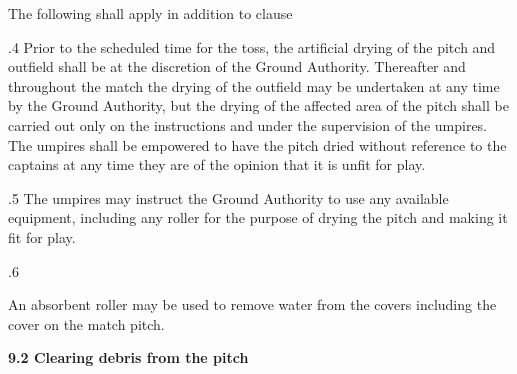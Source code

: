 \documentclass[12pt]{article}
\begin{document}
\vspace{\baselineskip}
{\fontsize{9pt}{10.8pt}\selectfont The following shall apply in addition to clause \par}\par


\vspace{\baselineskip}
\begin{adjustwidth}{0.5in}{0.07in}
\begin{justify}
{\fontsize{9pt}{10.8pt}.4 \tabto{0.49in} Prior to the scheduled time for the toss, the artificial drying of the pitch and outfield shall be at the discretion of the Ground Authority. Thereafter and throughout the match the drying of the outfield may be undertaken at any time by the Ground Authority, but the drying of the affected area of the pitch shall be carried out only on the instructions and under the supervision of the umpires. The umpires shall be empowered to have the pitch dried without reference to the captains at any time they are of the opinion that it is unfit for play.\par}
\end{justify}\par

\end{adjustwidth}


\vspace{\baselineskip}
\begin{adjustwidth}{0.5in}{0.15in}
{\fontsize{9pt}{10.8pt}.5 \tabto{0.49in} The umpires may instruct the Ground Authority to use any available equipment, including any roller for the purpose of drying the pitch and making it fit for play.\par}\par

\end{adjustwidth}


\vspace{\baselineskip}
{\fontsize{9pt}{10.8pt}.6 \tabto{0.49in} {\fontsize{8pt}{9.6pt}\selectfont An absorbent roller may be used to remove water from the covers including the cover on the match pitch.\par}\par}\par


\vspace{\baselineskip}
{\fontsize{11pt}{13.2pt}\selectfont \textbf{9.2 \tabto{0.47in} Clearing debris from the pitch}\par}\par
\end{document}
